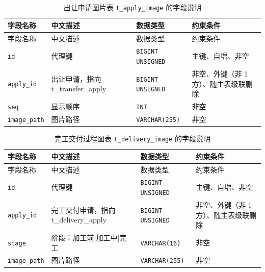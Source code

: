 \documentclass[12pt, a4paper]{ctexart}
\newcommand{\code}[1]{\texttt{\small #1}}
\begin{document}
\begin{longtable}{@{}p{3.1cm} p{4.5cm} p{2.4cm} p{4.5cm}@{}}
\caption{出让申请图片表 \code{t\_apply\_image} 的字段说明}\label{tab:f-t-apply-image}\\
\toprule
字段名称 & 中文描述 & 数据类型 & 约束条件 \\
\midrule
\endfirsthead
\toprule
字段名称 & 中文描述 & 数据类型 & 约束条件 \\
\midrule
\endhead
\bottomrule
\endlastfoot
\code{id} & 代理键 & \code{BIGINT UNSIGNED} & 主键、自增、非空 \\
\code{apply\_id} & 出让申请，指向 t\_transfer\_apply & \code{BIGINT UNSIGNED} & 非空、外键（非 1 方）、随主表级联删除 \\
\code{seq} & 显示顺序 & \code{INT} & 非空 \\
\code{image\_path} & 图片路径 & \code{VARCHAR(255)} & 非空 \\
\end{longtable}

\begin{longtable}{@{}p{3.1cm} p{4.5cm} p{2.4cm} p{4.5cm}@{}}
\caption{完工交付过程图表 \code{t\_delivery\_image} 的字段说明}\label{tab:f-t-delivery-image}\\
\toprule
字段名称 & 中文描述 & 数据类型 & 约束条件 \\
\midrule
\endfirsthead
\toprule
字段名称 & 中文描述 & 数据类型 & 约束条件 \\
\midrule
\endhead
\bottomrule
\endlastfoot
\code{id} & 代理键 & \code{BIGINT UNSIGNED} & 主键、自增、非空 \\
\code{apply\_id} & 完工交付申请，指向 t\_delivery\_apply & \code{BIGINT UNSIGNED} & 非空、外键（非 1 方）、随主表级联删除 \\
\code{stage} & 阶段：加工前|加工中|完工 & \code{VARCHAR(16)} & 非空 \\
\code{image\_path} & 图片路径 & \code{VARCHAR(255)} & 非空 \\
\end{longtable}
\end{document}

